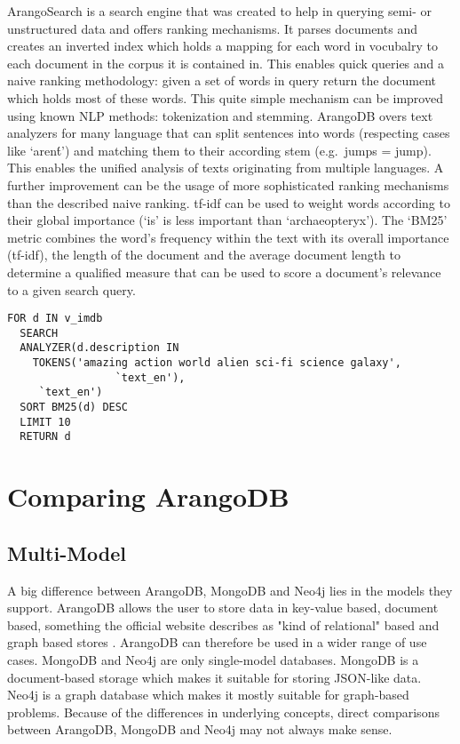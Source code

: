 ArangoSearch is a search engine that was created to help in querying semi- or unstructured data and offers ranking mechanisms. It parses documents and creates an inverted index which holds a mapping for each word in vocubalry to each document in the corpus it is contained in. This enables quick queries and a naive ranking methodology: given a set of words in query return the document which holds most of these words.
This quite simple mechanism can be improved using known NLP methods: tokenization and stemming. ArangoDB overs text analyzers for many language that can split sentences into words (respecting cases like `aren\'t') and matching them to their according stem (e.g.\ jumps = jump). This enables the unified analysis of texts originating from multiple languages.
A further improvement can be the usage of more sophisticated ranking mechanisms than the described naive ranking. \gls{tf-idf} can be used to weight words according to their global importance (`is' is less important than `archaeopteryx').
The `BM25' metric combines the word's frequency within the text with its overall importance (\gls{tf-idf}), the length of the document and the average document length to determine a qualified measure that can be used to score a document's relevance to a given search query. \parencite{ArangoSearchTut}

\begin{lstlisting}[language=ArangoQL,caption={Searching a database of movie descriptions}]
FOR d IN v_imdb 
  SEARCH 
  ANALYZER(d.description IN 
    TOKENS('amazing action world alien sci-fi science galaxy', 
                 `text_en'),
     `text_en')
  SORT BM25(d) DESC 
  LIMIT 10 
  RETURN d
\end{lstlisting}

\section{Comparing ArangoDB}

\subsection{Multi-Model}
A big difference between ArangoDB, MongoDB and Neo4j lies in the models they support. ArangoDB allows the user to store data in key-value based, document based, something the official website describes as "kind of relational" based and graph based stores \parencite{DBBenchmark}. ArangoDB can therefore be used in a wider range of use cases. MongoDB and Neo4j are only single-model databases. MongoDB is a document-based storage which makes it suitable for storing JSON-like data. Neo4j is a graph database which makes it mostly suitable for graph-based problems. Because of the differences in underlying concepts, direct comparisons between ArangoDB, MongoDB and Neo4j may not always make sense.

